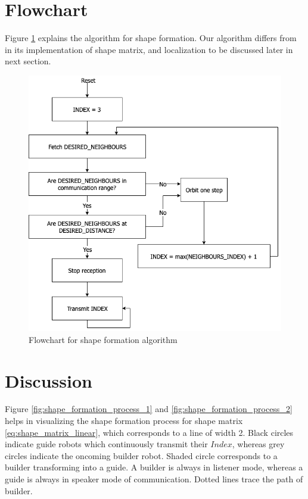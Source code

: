 \documentclass{report}[12pt]
\begin{document}
\section{Flowchart}
Figure \ref{fig:fc_shape_form} explains the algorithm for shape formation. Our algorithm differs from \cite{MR-AC-RN:2014} in its implementation of shape matrix, and localization to be discussed later in next section.
\begin{figure}[H]
	\centering
	\includegraphics[scale=0.6]{images/shape_formation}
	\caption{Flowchart for shape formation algorithm}
	\label{fig:fc_shape_form}
\end{figure}

\section{Discussion}
Figure \ref{fig:shape_formation_process_1} and \ref{fig:shape_formation_process_2} helps in visualizing the shape formation process for shape matrix \eqref{eq:shape_matrix_linear}, which corresponds to a line of width 2. Black circles indicate guide robots which continuously transmit their $Index$, whereas grey circles indicate the oncoming builder robot. Shaded circle corresponds to a builder transforming into a guide. A builder is always in listener mode, whereas a guide is always in speaker mode of communication. Dotted lines trace the path of builder.
\end{document}
